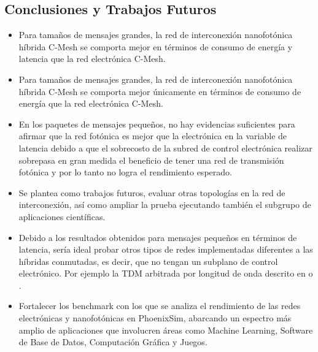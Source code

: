 \subsection{Conclusiones y Trabajos Futuros}

\begin{itemize}
\item Para tamaños de mensajes grandes, la red de interconexión nanofotónica
híbrida C-Mesh se comporta mejor en términos de consumo de energía y latencia
que la red electrónica C-Mesh.
\item  Para tamaños de mensajes grandes, la red de interconexión nanofotónica
híbrida C-Mesh se comporta mejor únicamente en términos de consumo de energía 
que la red electrónica C-Mesh.
\item  En los paquetes de mensajes pequeños,
no hay evidencias suficientes para afirmar que la red fotónica
es mejor que la electrónica en la variable de latencia debido a que
el sobrecosto de la subred de control electrónica realizar 
sobrepasa en gran medida el beneficio de tener una red de transmisión fotónica 
y por lo tanto no logra el rendimiento esperado.
\item Se plantea como trabajos futuros, evaluar otras topologías en
la red de interconexión, así como ampliar la prueba ejecutando también
el subgrupo de aplicaciones científicas.
\item Debido a los resultados obtenidos para mensajes pequeños en términos de 
latencia, sería ideal probar otros tipos de redes implementadas
diferentes a las híbridas conmutadas, es decir, que no tengan un subplano
de control electrónico. Por ejemplo la TDM arbitrada por longitud de onda
descrito en \cite{hendry2011time} o \cite{vantrease2008corona}.
\item Fortalecer los benchmark con los que se analiza el rendimiento de las redes
electrónicas y nanofotónicas en PhoenixSim, abarcando un espectro más amplio
de aplicaciones que involucren áreas como Machine Learning, Software de Base de Datos,
Computación Gráfica y Juegos.
\end{itemize} 
